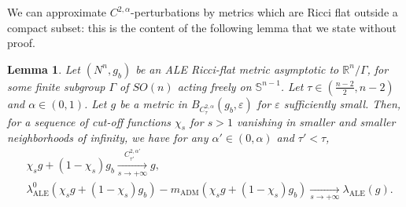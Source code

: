 \documentclass[a4paper,11pt,reqno]{amsart}
\newtheorem{lemma}[defn]{Lemma}
\def\RR{\mathbb{R}}
\numberwithin{equation}{section}
\begin{document}
	We can approximate $C^{2,\alpha}$-perturbations by metrics which are Ricci flat outside a compact subset: this is the content of the following lemma that we state without proof.
	\begin{lemma}\label{cutoffC2alphatau}
		Let $(N^n,g_b)$ be an ALE Ricci-flat metric asymptotic to $\RR^n\slash\Gamma$, for some finite subgroup $\Gamma$ of $SO(n)$ acting freely on $\mathbb{S}^{n-1}$. Let $\tau\in\left(\frac{n-2}{2},n-2\right)$ and $\alpha\in (0,1)$. Let $g$ be a metric in $B_{C^{2,\alpha}_{\tau}}(g_b,\varepsilon)$ for $\varepsilon$ sufficiently small. Then, for a sequence of cut-off functions $\chi_s$ for $s>1$ vanishing in smaller and smaller neighborhoods of infinity, we have for any $\alpha'\in(0,\alpha)$ and $\tau'<\tau$,
		\begin{equation*}
		\begin{split}
		&\chi_sg + (1-\chi_s)g_b\xrightarrow[s\to +\infty]{C^{2,\alpha'}_{\tau'}} g,\\
		&\lambda_{\operatorname{ALE}}^0(\chi_sg + (1-\chi_s)g_b)-m_{\operatorname{ADM}}(\chi_sg + (1-\chi_s)g_b)\xrightarrow[s\to +\infty]{} \lambda_{\operatorname{ALE}}(g).
		\end{split}
		\end{equation*}
	\end{lemma}
	
\end{document}
